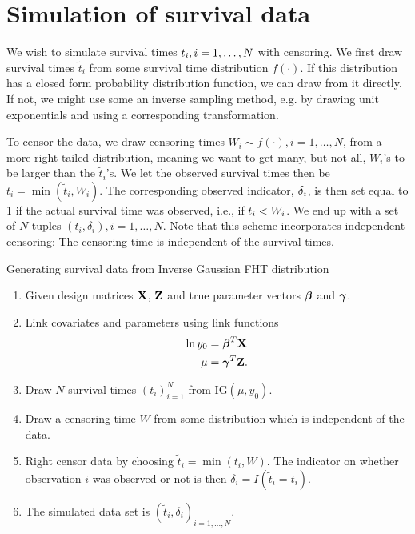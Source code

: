 \section{Simulation of survival data}
We wish to simulate survival times $t_{i},i=1,\ldots,N$ with censoring. We first draw survival times $\tilde{t}_i$ from some survival time distribution $f(\cdot)$. If this distribution has a closed form probability distribution function, we can draw from it directly. If not, we might use some an inverse sampling method, e.g. by drawing unit exponentials and using a corresponding transformation.

To censor the data, we draw censoring times $W_i\sim f(\cdot),i=1,\ldots,N$, from a more right-tailed distribution, meaning we want to get many, but not all, $W_i$'s to be larger than the $\tilde{t}_i$'s. We let the observed survival times then be $t_i=\min(\tilde{t}_i,W_i)$.
The corresponding observed indicator, $\delta_{i}$, is then set equal to 1 if the actual survival time was observed, i.e., if $t_{i}<W_i$. We end up with a set of $N$ tuples $(t_i,\delta_i),i=1,\ldots,N$. Note that this scheme incorporates independent censoring: The censoring time is independent of the survival times.

\begin{algorithm}
\caption{Generating survival data from Inverse Gaussian FHT distribution}
\label{algo:FHT-sim}
\begin{enumerate}
    \item Given design matrices $\mathbf{X}$, $\mathbf{Z}$ and true parameter vectors $\boldsymbol{\beta}$ and $\boldsymbol{\gamma}$.
    \item Link covariates and parameters using link functions
        \begin{align*}
            \ln y_0&=\boldsymbol{\beta}^T\mathbf{X} \\
            \mu&=\boldsymbol{\gamma}^T\mathbf{Z}.
        \end{align*}
    \item Draw $N$ survival times $(t_i)_{i=1}^N$ from IG$(\mu,y_0)$.
    \item Draw a censoring time $W$ from some distribution which is independent of the data.
    \item Right censor data by choosing $\widetilde{t}_i=\min(t_i,W)$. The indicator on whether observation $i$ was observed or not is then $\delta_i=I(\widetilde{t}_i=t_i)$.
    \item The simulated data set is $(\widetilde{t}_i,\delta_i)_{i=1,\ldots,N}$.
\end{enumerate}
\end{algorithm}

